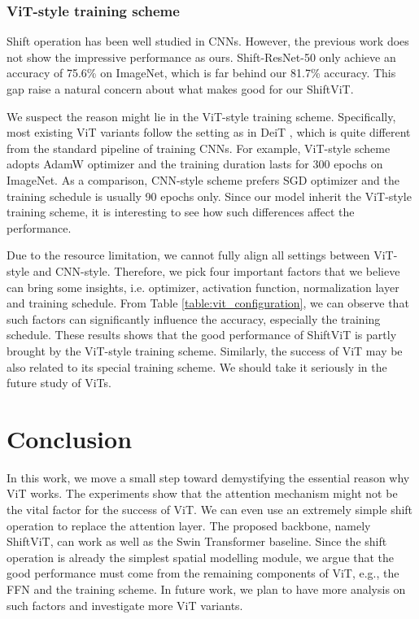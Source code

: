 \documentclass[letterpaper]{article} \usepackage{aaai22}  \usepackage{times}  \usepackage{helvet}  \usepackage{courier}  \usepackage[hyphens]{url}  \usepackage{graphicx} \usepackage{amsmath}
\begin{document}
\subsubsection{ViT-style training scheme} Shift operation has been well studied in CNNs. However, the previous work does not show the impressive performance as ours. Shift-ResNet-50 \cite{ShiftResNet} only achieve an accuracy of 75.6\% on ImageNet, which is far behind our 81.7\% accuracy. This gap raise a natural concern about what makes good for our ShiftViT.

We suspect the reason might lie in the ViT-style training scheme. Specifically, most existing ViT variants follow the setting as in DeiT \cite{DeiT}, which is quite different from the standard pipeline of training CNNs. For example, ViT-style scheme adopts AdamW optimizer and the training duration lasts for 300 epochs on ImageNet. As a comparison, CNN-style scheme prefers SGD optimizer and the training schedule is usually 90 epochs only. Since our model inherit the ViT-style training scheme, it is interesting to see how such differences affect the performance.

Due to the resource limitation, we cannot fully align all settings between ViT-style and CNN-style. Therefore, we pick four important factors that we believe can bring some insights, i.e. optimizer, activation function, normalization layer and training schedule. From Table \ref{table:vit_configuration}, we can observe that such factors can significantly influence the accuracy, especially the training schedule. These results shows that the good performance of ShiftViT is partly brought by the ViT-style training scheme. Similarly, the success of ViT may be also related to its special training scheme. We should take it seriously in the future study of ViTs.







\section{Conclusion}

In this work, we move a small step toward demystifying the essential reason why ViT works. The experiments show that the attention mechanism might not be the vital factor for the success of ViT. We can even use an extremely simple shift operation to replace the attention layer. The proposed backbone, namely ShiftViT, can work as well as the Swin Transformer baseline. Since the shift operation is already the simplest spatial modelling module, we argue that the good performance must come from the remaining components of ViT, e.g., the FFN and the training scheme. In future work, we plan to have more analysis on such factors and investigate more ViT variants.


\end{document}
